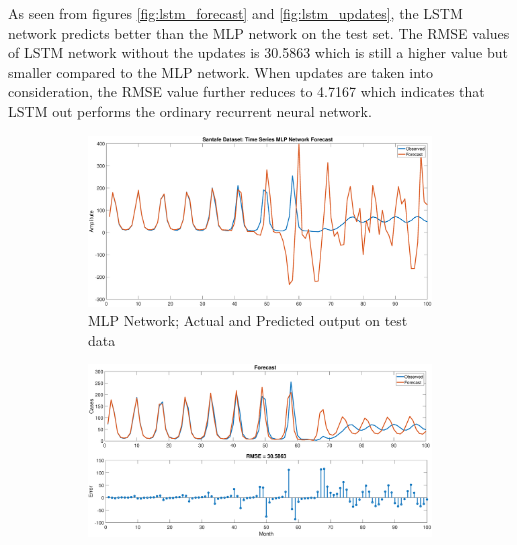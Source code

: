 As seen from figures \ref{fig:lstm_forecast} and \ref{fig:lstm_updates}, the LSTM network predicts better than the MLP network on the test set. The RMSE values of LSTM network without the updates is 30.5863 which is still a higher value but smaller compared to the MLP network. When updates are taken into consideration, the RMSE value further reduces to 4.7167 which indicates that LSTM out performs the ordinary recurrent neural network.
\begin{figure}[!htpb] 
	\centering
	\begin{subfigure}[b]{0.33\textwidth}
		\captionsetup{width=0.8\linewidth, format = hang}
		\includegraphics[height = 0.8\textwidth,width = 1\textwidth]{Exercise2/Report/mlp_forecast}
		\caption{MLP Network; Actual and Predicted output on test data }\label{fig:mlp_forecast}
	\end{subfigure}%
	\begin{subfigure}[b]{0.33\textwidth}
		\captionsetup{width=0.8\linewidth, format = hang}
		\includegraphics[height = 0.8\textwidth,width = 1\textwidth]{Exercise2/Report/lstm_forecast}

\end{subfigure}
\end{figure}
